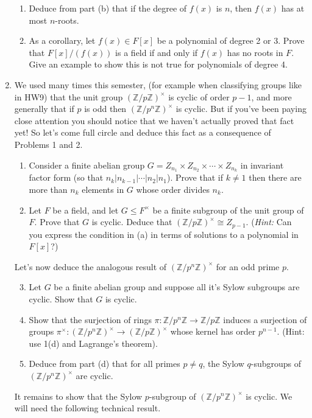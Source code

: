 \documentclass[11pt]{article}
\newcommand{\bZ}{\mathbb{Z}}
\begin{document}
\begin{enumerate}
{\begin{enumerate}
{    }
    \item{
    Deduce from part (b) that if the degree of $f(x)$ is $n$, then $f(x)$ has at most $n$-roots.
    }
    \item{
    As a corollary, let $f(x)\in F[x]$ be a polynomial of degree 2 or 3.  Prove that $F[x]/(f(x))$ is a field if and only if $f(x)$ has no roots in $F$.  Give an example to show this is not true for polynomials of degree 4.
    }
  \end{enumerate}
  }
  \item{
  We used many times this semester, (for example when classifying groups like in HW9) that the unit group $(\bZ/p\bZ)^\times$ is cyclic of order $p-1$, and more generally that if $p$ is odd then $(\bZ/p^n\bZ)^\times$ is cyclic.  But if you've been paying close attention you should notice that we haven't actually proved that fact yet!  So let's come full circle and deduce this fact as a consequence of Problems 1 and 2.
  \begin{enumerate}
    \item{
    Consider a finite abelian group $G = Z_{n_1}\times Z_{n_2}\times\cdots\times Z_{n_k}$ in invariant factor form (so that $n_k|n_{k-1}|\cdots|n_2|n_1$).  Prove that if $k\not=1$ then there are more than $n_k$ elements in $G$ whose order divides $n_k$.
    }
    \item{
    Let $F$ be a field, and let $G\le F^\times$ be a finite subgroup of the unit group of $F$.  Prove that $G$ is cyclic.  Deduce that $(\bZ/p\bZ)^\times\cong Z_{p-1}$.  (\textit{Hint:} Can you express the condition in (a) in terms of solutions to a polynomial in $F[x]$?)
    }
  \end{enumerate}
  Let's now deduce the analogous result of $(\bZ/p^n\bZ)^\times$ for an odd prime $p$.
  \begin{enumerate}
    \setcounter{enumii}{2}
    \item{
    Let $G$ be a finite abelian group and suppose all it's Sylow subgroups are cyclic.  Show that $G$ is cyclic.
    }
    \item{
    Show that the surjection of rings $\pi:\bZ/p^n\bZ\to\bZ/p\bZ$ induces a surjection of groups $\pi^\times:(\bZ/p^n\bZ)^\times\to(\bZ/p\bZ)^\times$ whose kernel has order $p^{n-1}$.  (Hint: use 1(d) and Lagrange's theorem).
    }
    \item{
    Deduce from part (d) that for all primes $p\not=q$, the Sylow $q$-subgroups of $(\bZ/p^n\bZ)^\times$ are cyclic.
    }
  \end{enumerate}
  It remains to show that the Sylow $p$-subgroup of $(\bZ/p^n\bZ)^\times$ is cyclic.  We will need the following technical result.
}
\end{enumerate}
\end{document}
